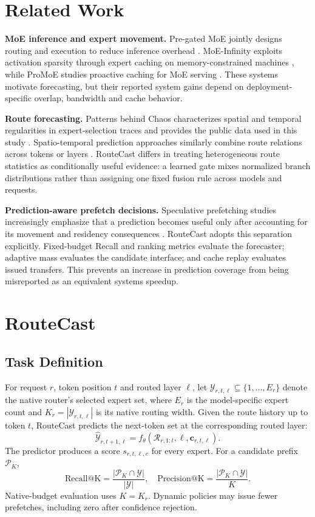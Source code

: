 \documentclass[conference]{IEEEtran}
\begin{document}
\section{Related Work}
\textbf{MoE inference and expert movement.}
Pre-gated MoE jointly designs routing and execution to reduce inference overhead \cite{pregated}. MoE-Infinity exploits activation sparsity through expert caching on memory-constrained machines \cite{moeinfinity}, while ProMoE studies proactive caching for MoE serving \cite{promoe}. These systems motivate forecasting, but their reported system gains depend on deployment-specific overlap, bandwidth and cache behavior.

\textbf{Route forecasting.}
Patterns behind Chaos characterizes spatial and temporal regularities in expert-selection traces and provides the public data used in this study \cite{patterns}. Spatio-temporal prediction approaches similarly combine route relations across tokens or layers \cite{stmoe}. RouteCast differs in treating heterogeneous route statistics as conditionally useful evidence: a learned gate mixes normalized branch distributions rather than assigning one fixed fusion rule across models and requests.

\textbf{Prediction-aware prefetch decisions.}
Speculative prefetching studies increasingly emphasize that a prediction becomes useful only after accounting for its movement and residency consequences \cite{specmd,specprefetch}. RouteCast adopts this separation explicitly. Fixed-budget Recall and ranking metrics evaluate the forecaster; adaptive mass evaluates the candidate interface; and cache replay evaluates issued transfers. This prevents an increase in prediction coverage from being misreported as an equivalent systems speedup.

\section{RouteCast}
\subsection{Task Definition}
For request $r$, token position $t$ and routed layer $\ell$, let
$\mathcal{Y}_{r,t,\ell}\subseteq\{1,\ldots,E_r\}$ denote the native router's selected expert set, where $E_r$ is the model-specific expert count and $K_r=|\mathcal{Y}_{r,t,\ell}|$ is its native routing width. Given the route history up to token $t$, RouteCast predicts the next-token set at the corresponding routed layer:
\begin{equation}
\hat{\mathcal{Y}}_{r,t+1,\ell}
=f_\theta(\mathcal{R}_{r,1:t},\ell,\mathbf{c}_{r,t,\ell}).
\end{equation}
The predictor produces a score $s_{r,t,\ell,e}$ for every expert. For a candidate prefix $\mathcal{P}_{K}$,
\begin{equation}
\mathrm{Recall@K}=\frac{|\mathcal{P}_{K}\cap\mathcal{Y}|}{|\mathcal{Y}|},\quad
\mathrm{Precision@K}=\frac{|\mathcal{P}_{K}\cap\mathcal{Y}|}{K}.
\end{equation}
Native-budget evaluation uses $K=K_r$. Dynamic policies may issue fewer prefetches, including zero after confidence rejection.
\end{document}
